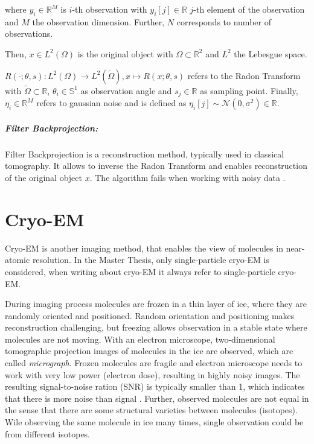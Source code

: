 where $y_i \in \mathbb{R}^M$ is $i$-th observation with $y_i[j] \in \mathbb{R}$ $j$-th element of the observation
and $M$ the observation dimension. 
Further, $N$ corresponds to number of observations.

Then, $x \in L^2(\Omega)$ is the original object with $\Omega \subset \mathbb{R}^2 $ and $L^2$ the Lebesgue space.

$R(\cdot; \theta, s): L^2(\Omega) \to L^2(\tilde{\Omega}) , x \mapsto R(x; \theta,s)$ refers to the Radon Transform \cite{radonTransform} 
with $\tilde{\Omega} \subset \mathbb{R}$, $\theta_i \in \mathbb{S}^1$ as observation angle and $s_j \in \mathbb{R}$ 
as sampling point. Finally, $\eta_i \in \mathbb{R}^M$ refers to gaussian noise and 
is defined as $\eta_i[j] \sim \mathcal{N}(0,\sigma^2) \in \mathbb{R}$.

\subparagraph{Filter Backprojection:}
Filter Backprojection \cite{tomographicReconstruction} is a reconstruction method, typically used in classical tomography.
It allows to inverse the Radon Transform and enables reconstruction of the original object $x$. 
The algorithm fails when working with noisy data \cite{cryoEmMath2}.

\section{Cryo-EM}
Cryo-EM is another imaging method, that enables the view of molecules in near-atomic resolution.
In the Master Thesis, only single-particle cryo-EM \cite{singleParticleCryoEm} is considered, when writing about cryo-EM it always refer to single-particle cryo-EM.

During imaging process molecules are frozen in a thin layer of ice, where they are randomly oriented and positioned. 
Random orientation and positioning makes reconstruction challenging, 
but freezing allows observation in a stable state where molecules are not moving.
With an electron microscope, two-dimensional tomographic projection images of molecules in the ice are observed,
which are called \textit{micrograph}. 
Frozen molecules are fragile and electron microscope needs to work with
very low power (electron dose), resulting in highly noisy images. The resulting signal-to-noise ration (SNR)
is typically smaller than 1, which indicates that there is more noise than signal \cite{cryoEmMath2}.
Further, observed molecules are not equal in the sense that there are some structural varieties between
molecules (isotopes). Wile observing the same molecule in ice many times, single observation could be from different isotopes.


